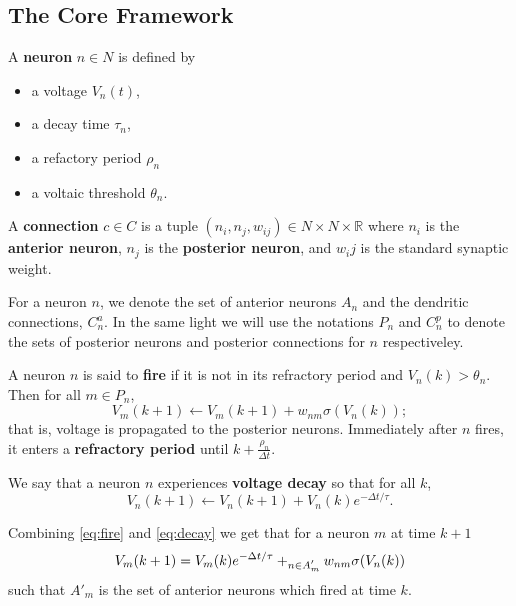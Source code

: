 \subsection{The Core Framework}

\begin{definition}\label{neuron}
	A \textbf{neuron} $n \in N$ is defined by
	\begin{itemize}
		\item a voltage $V_n(t)$,
		\item a decay time $\tau_n$,
		\item a refactory period $\rho_n$
		\item a voltaic threshold $\theta_n$.
	\end{itemize}
\end{definition}
\begin{definition}\label{connection}
	A \textbf{connection} $c \in C$ is a tuple $(n_i, n_j, w_{ij}) \in N \times N \times \mathbb{R}$
	where $n_i$ is  the \textbf{anterior neuron}, $n_j$ is the \textbf{posterior neuron}, and $w_ij$
	is the standard synaptic weight.
\end{definition}
For a neuron $n$, we denote the set of anterior neurons $A_n$ and the dendritic connections, $C_{n}^a$. In the same light we will use the notations $P_n$ and $C_n^p$ to denote the sets of posterior neurons and posterior connections for $n$ respectiveley.
\begin{definition}\label{fire}
	A neuron $n$ is said to \textbf{fire} if it is not in its refractory period and $V_n(k) > \theta_n$. Then for all $m \in P_n$, 
	\begin{equation}
		V_m(k+1) \leftarrow V_m(k+1) + w_{nm} \sigma(V_n(k)); \label{eq:fire}
	\end{equation}
	that is, voltage is propagated to the posterior neurons. 	Immediately after $n$ fires, it enters  a \textbf{refractory period} until $k + \frac{\rho_n}{\Delta t}$.
\end{definition}

\begin{definition}\label{decay}
	We say that a neuron $n$ experiences \textbf{voltage decay} so that for all $k$,
	\begin{equation}
		V_n(k+1) \leftarrow V_n(k+1) + V_n(k)e^{-\Delta t/\tau}. \label{eq:decay}
	\end{equation}
\end{definition}

Combining \eqref{eq:fire} and \eqref{eq:decay} we get that for a neuron $m$ at time $k+1$
\begin{equation}
	V_m(k+1) = V_m(k)e^{-\Delta  t/\tau} + \relax_{\substack{n \in A'_m}} w_{nm} \sigma(V_n(k))
\end{equation}
such that $A'_m$ is the set of anterior neurons which fired at time $k.$